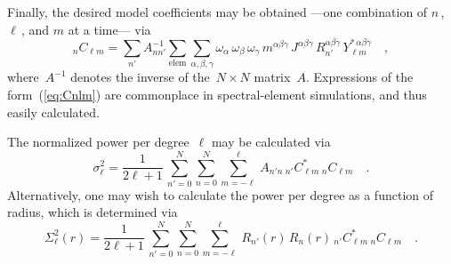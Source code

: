 \documentclass[extra,mreferee]{gji}
\begin{document}
Finally, the desired model coefficients may be obtained ---one combination of $n$\,, $\ell$\,, and $m$ at a time--- via
\begin{equation}
    {}_nC_{\ell m}=\sum_{n'}A^{-1}_{nn'}\sum_{\mathrm{elem}}\sum_{\alpha,\beta,\gamma}\omega_\alpha\,\omega_\beta\,\omega_\gamma\,m^{\alpha\beta\gamma}\,J^{\alpha\beta\gamma}\,R_{n'}^{\alpha\beta\gamma}\,Y_{\ell m}^{*\,\alpha\beta\gamma}
    \quad ,
    \label{eq:Cnlm}
\end{equation}
where~$A^{-1}$ denotes the inverse of the~$N\times N$ matrix~$A$.
Expressions of the form~(\ref{eq:Cnlm}) are commonplace in spectral-element simulations,
and thus easily calculated.

The normalized power per degree~$\ell$ may be calculated via
\begin{equation}
    \sigma_\ell^2=\frac{1}{2\ell+1}\,
    \sum_{n' = 0}^N\sum_{n = 0}^N\sum_{m = -\ell}^\ell\,A_{n'n}\,{}_{n'}C^*_{\ell m}\,{}_{n}C_{\ell m}
    \quad .
\end{equation}
Alternatively,
one may wish to calculate the power per degree as a function of radius,
which is determined via
\begin{equation}
    \Sigma_\ell^2(r)=\frac{1}{2\ell+1}\,
    \sum_{n' = 0}^N\sum_{n = 0}^N\sum_{m = -\ell}^\ell\,R_{n'}(r)\,R_{n}(r)\,{}_{n'}C^*_{\ell m}\,{}_{n}C_{\ell m}
    \quad .
\end{equation}
\end{document}
